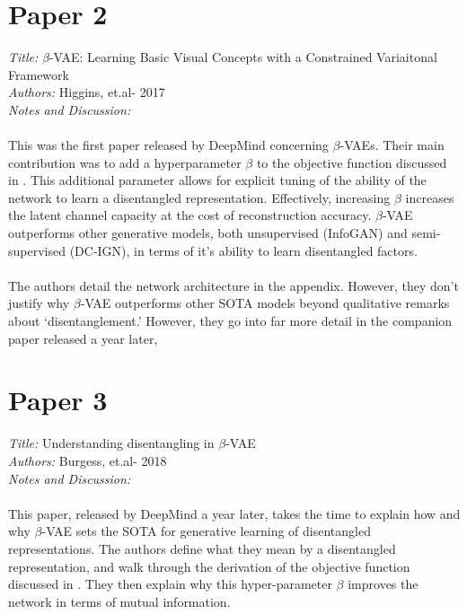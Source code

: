 \documentclass[justified,nobib]{tufte-handout}
\begin{document}
\begin{fullwidth}
\section{Paper 2}
\textit{Title:} $\beta$-VAE: Learning Basic Visual Concepts with a Constrained Variaitonal Framework  \cite{bvae} \\
\textit{Authors: }Higgins, et.al- 2017 \\
\textit{Notes and Discussion:}
\paragraph{} This was the first paper released by DeepMind concerning $\beta$-VAEs. Their main contribution was to add a hyperparameter $\beta$ to the objective function discussed in \citep{ae}. This additional parameter allows for explicit tuning of the ability of the network to learn a disentangled representation. Effectively, increasing $\beta$ increases the latent channel capacity at the cost of reconstruction accuracy. $\beta$-VAE outperforms other generative models, both unsupervised (InfoGAN) and semi-supervised (DC-IGN), in terms of it's ability to learn disentangled factors. 
\paragraph{} The authors detail the network architecture in the appendix. However, they don't justify why $\beta$-VAE outperforms other SOTA models beyond qualitative remarks about `disentanglement.' However, they go into far more detail in the companion paper released a year later, \citep{bvae-dis}    \\
\clearpage
\section{Paper 3}
\textit{Title:} Understanding disentangling in  $\beta$-VAE  \cite{bvae-dis} \\
\textit{Authors: }Burgess, et.al- 2018 \\
\textit{Notes and Discussion:} \\
\paragraph{} This paper, released by DeepMind a year later, takes the time to explain how and why $\beta$-VAE sets the SOTA for generative learning of disentangled representations. The authors define what they mean by a disentangled representation, and walk through the derivation of the objective function discussed in \citep{ae}. They then explain why  this hyper-parameter $\beta$ improves the network in terms of mutual information.

\end{fullwidth}
\end{document}
